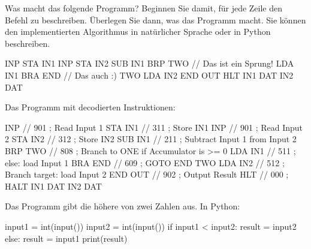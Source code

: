 \cprotEnv\begin{question}
	Was macht das folgende Programm? Beginnen Sie damit, für jede Zeile den Befehl zu beschreiben. Überlegen Sie dann, was das Programm macht. Sie können den implementierten Algorithmus in natürlicher Sprache oder in Python beschreiben.

	\begin{assembly}
	INP    
	STA IN1
	INP    
	STA IN2
	SUB IN1
	BRP TWO  // Das ist ein Sprung!
	LDA IN1
	BRA END  // Das auch :)
TWO LDA IN2
END OUT
	HLT    
IN1 DAT
IN2 DAT
			\end{assembly}
\end{question}
\cprotEnv\begin{solution}
	Das Programm mit decodierten Instruktionen:
	\begin{assembly}
	INP     // 901  ; Read Input 1
	STA IN1 // 311  ; Store IN1
	INP     // 901  ; Read Input 2
	STA IN2 // 312  ; Store IN2
	SUB IN1 // 211  ; Subtract Input 1 from Input 2
	BRP TWO // 808  ; Branch to ONE if Accumulator is >= 0
	LDA IN1 // 511  ; else: load Input 1
	BRA END // 609  ; GOTO END
TWO LDA IN2 // 512  ; Branch target: load Input 2
END	OUT     // 902  ; Output Result
	HLT     // 000  ; HALT
IN1 DAT
IN2 DAT
	\end{assembly}

	Das Programm gibt die höhere von zwei Zahlen aus. In Python:
	\begin{python}
input1 = int(input())
input2 = int(input())
if input1 < input2:
	result = input2
else:
	result = input1
print(result)
	\end{python}
	
\end{solution}

